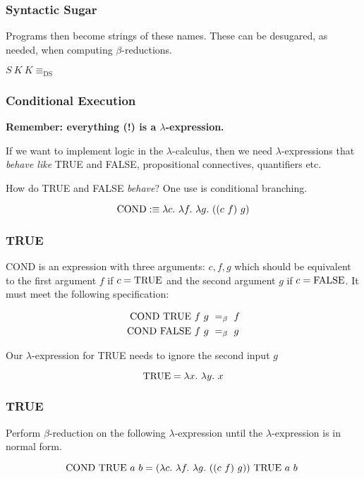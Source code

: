 \documentclass{beamer}
\begin{document}
\begin{frame}
	\frametitle{Syntactic Sugar}

	Programs then become strings of these names. These can be desugared, as needed, when computing $\beta$-reductions. 

	$S \ K \ K \equiv_{\text{DS}}$

	\vspace{60mm}

\end{frame}

\begin{frame}
	\frametitle{Conditional Execution}

	{\bf Remember: everything (!) is a $\lambda$-expression.}

	If we want to implement logic in the $\lambda$-calculus, then we need $\lambda$-expressions that \emph{behave like} TRUE and FALSE, propositional connectives, quantifiers etc.

	\vspace{5mm}

	How do TRUE and FALSE \emph{behave}? One use is conditional branching.

	$$\COND :\equiv \lambda c. \ \lambda f. \ \lambda g. \ ((c \ f) \ g) $$

	\vspace{20mm}

\end{frame}

\begin{frame}
	\frametitle{TRUE}

	COND is an expression with three arguments: $c,f,g$ which should be equivalent to the first argument $f$ if $c = \text{TRUE}$ and the second argument $g$ if $c = \text{FALSE}$. It must meet the following specification: 

	\begin{align*}
		\text{COND} \ \text{TRUE} \ f \ g \ &=_{\beta} \ f \\
		\text{COND} \ \text{FALSE} \ f \ g \ &=_{\beta} \ g 
	\end{align*}

	Our $\lambda$-expression for TRUE needs to ignore the second input $g$ 

	$$\TRUE = \lambda x. \ \lambda y. \ x$$

	\vspace{20mm}

\end{frame}

\begin{frame}
	\frametitle{TRUE}

	Perform $\beta$-reduction on the following $\lambda$-expression until the $\lambda$-expression is in normal form. 

	$$ \COND \ \TRUE \ a \ b = (\lambda c. \ \lambda f. \ \lambda g. \  ((c \ f) \ g) ) \ \TRUE \ a \ b \ $$

	\vspace{5cm}

\end{frame}
\end{document}
